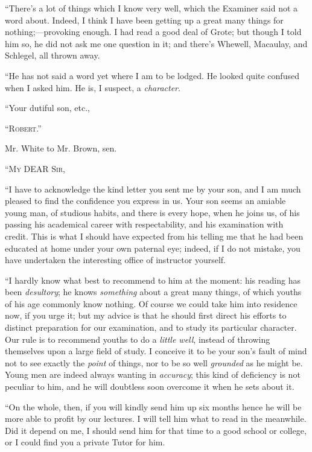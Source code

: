 ``There's a lot of things which I know very well, which the
Examiner said not a word about. Indeed, I think I have been getting up
a great many things for nothing;—provoking enough. I had read a good
deal of Grote; but though I told him so, he did not ask me one
question in it; and there's Whewell, Macaulay, and Schlegel, all
thrown away.

``He has not said a word yet where I am to be lodged. He looked
quite confused when I asked him. He is, I suspect, a \emph{character}.

``Your dutiful son, etc.,

``R\textsc{obert}.''

Mr. White to Mr. Brown, sen.

``M\textsc{y} DEAR S\textsc{ir},

``I have to acknowledge the kind letter you sent me by your son,
and I am much pleased to find the confidence you express in us. Your
son seems an amiable young man, of studious habits, and there is every
hope, when he joins us, of his passing his academical career with
respectability, and his examination with credit. This is what I should
have expected from his telling me that he had been educated at home
under your own paternal eye; indeed, if I do not mistake, you have
undertaken the interesting office of instructor yourself.

``I hardly know what best to recommend to him at the moment:
his reading has been \emph{desultory}; he knows \emph{something} about
a great many things, of which youths of his age commonly know nothing.
Of course we could take him into residence now, if you urge it; but my
advice is that he should first direct his efforts to distinct
preparation for our examination, and to study its particular character. Our rule is to recommend youths to do a \emph{little well},
instead of throwing themselves upon a large field of study. I conceive
it to be your son's fault of mind not to see exactly the \emph{point}
of things, nor to be so well \emph{grounded} as he might be. Young men
are indeed always wanting in \emph{accuracy}; this kind of deficiency
is not peculiar to him, and he will doubtless soon overcome it when he
sets about it.

``On the whole, then, if you will kindly send him up six months
hence he will be more able to profit by our lectures. I will tell him
what to read in the meanwhile. Did it depend on me, I should send him
for that time to a good school or college, or I could find you a
private Tutor for him.

